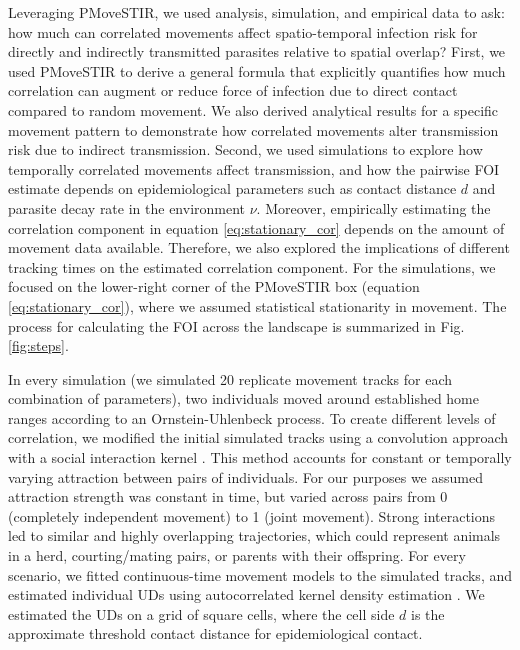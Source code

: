 \documentclass[letterpaper]{article}
\begin{document}
Leveraging PMoveSTIR, we used analysis, simulation, and empirical data to ask: how much can correlated movements affect spatio-temporal infection risk for directly and indirectly transmitted parasites relative to spatial overlap? 
First, we used PMoveSTIR to derive a general formula that explicitly quantifies how much correlation can augment or reduce force of infection due to direct contact compared to random movement. We also derived analytical results for a specific movement pattern to demonstrate how correlated movements alter transmission risk due to indirect transmission.
Second, we used simulations to explore how temporally correlated movements affect  transmission, and how the pairwise FOI estimate depends on epidemiological parameters such as contact distance $d$ and parasite decay rate in the environment $\nu$. Moreover, empirically estimating the correlation component in equation \ref{eq:stationary_cor} depends on the amount of movement data available. Therefore, we also explored the implications of different tracking times on the estimated correlation component. For the simulations, we focused on the lower-right corner of the PMoveSTIR box (equation \ref{eq:stationary_cor}), where we assumed statistical stationarity in movement. The process for calculating the FOI across the landscape is summarized in Fig. \ref{fig:steps}.

In every simulation (we simulated 20 replicate movement tracks for each combination of parameters), two individuals moved around established home ranges according to an Ornstein-Uhlenbeck process. To create different levels of correlation, we modified the initial simulated tracks using a convolution approach with a social interaction kernel \citep{Scharf2018}. This method accounts for constant or temporally varying attraction between pairs of individuals. For our purposes we assumed attraction strength was constant in time, but varied across pairs from 0 (completely independent movement) to 1 (joint movement). Strong interactions led to similar and highly overlapping trajectories, which could represent animals in a herd, courting/mating pairs, or parents with their offspring.
For every scenario, we fitted continuous-time movement models to the simulated tracks, and estimated individual UDs using autocorrelated kernel density estimation \citep{Calabrese2016}. We estimated the UDs on a grid of square cells, where the cell side $d$ is the approximate threshold contact distance for epidemiological contact. 
\end{document}
